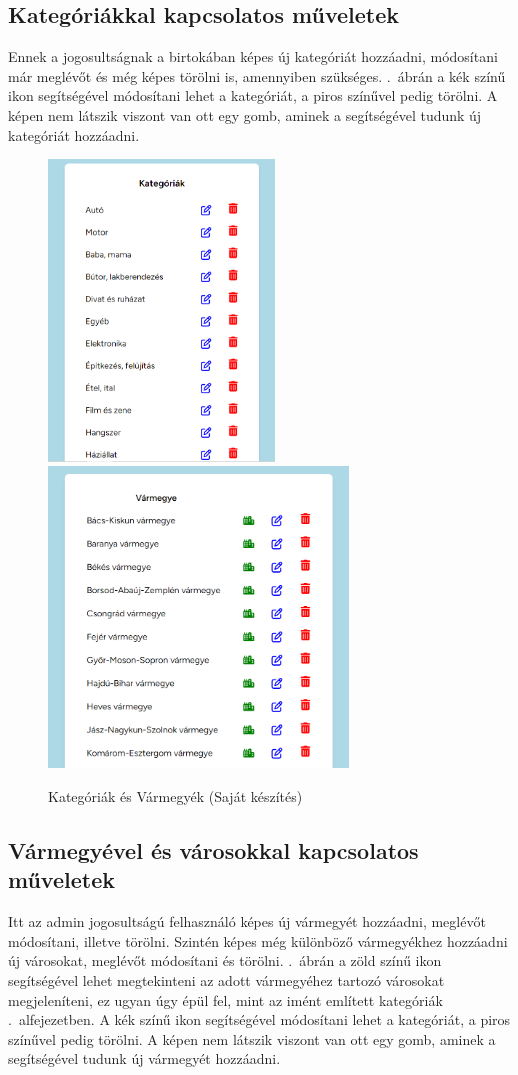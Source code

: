 \documentclass[]{thesis-ekf}
\theoremstyle{definition}
\theoremstyle{remark}
\begin{document}
	\subsection{Kategóriákkal kapcsolatos műveletek}\label{sc-kategoria}
		Ennek a jogosultságnak a birtokában képes új kategóriát hozzáadni, módosítani már meglévőt és még képes törölni is, amennyiben szükséges. .~ábrán a kék színű ikon segítségével módosítani lehet a kategóriát, a piros színűvel pedig törölni. A képen nem látszik viszont van ott egy gomb, aminek a segítségével tudunk új kategóriát hozzáadni.
		\begin{figure}[ht!]
			\centering
			\includegraphics[height=8cm]{./felhasznaloi/kategoria}
			\includegraphics[height=8cm]{./felhasznaloi/varmegye}
			\caption{Kategóriák és Vármegyék (Saját készítés)} 
			\label{kategoria-muveletek}
			\label{varmegye-varos-muvelet}
		\end{figure} 
	\subsection{Vármegyével és városokkal kapcsolatos műveletek}
		Itt az admin jogosultságú felhasználó képes új vármegyét hozzáadni, meglévőt módosítani, illetve törölni. Szintén képes még különböző vármegyékhez hozzáadni új városokat, meglévőt módosítani és törölni. .~ábrán a zöld színű ikon segítségével lehet megtekinteni az adott vármegyéhez tartozó városokat megjeleníteni, ez ugyan úgy épül fel, mint az imént említett kategóriák .~alfejezetben. A kék színű ikon segítségével módosítani lehet a kategóriát, a piros színűvel pedig törölni. A képen nem látszik viszont van ott egy gomb, aminek a segítségével tudunk új vármegyét hozzáadni.
\end{document}
